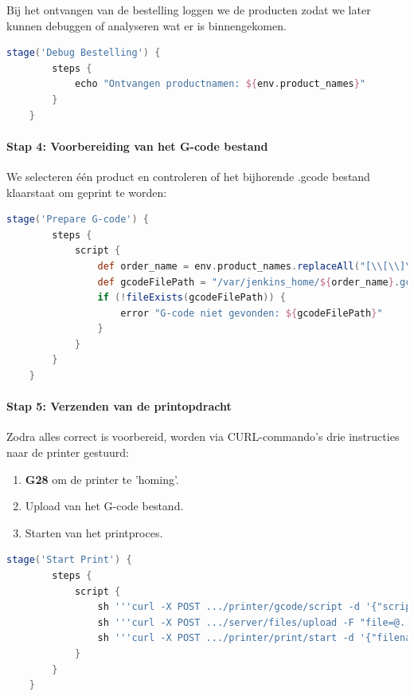 \begin{enumerate}
Bij het ontvangen van de bestelling loggen we de producten zodat we later kunnen debuggen of analyseren wat er is binnengekomen.

\begin{lstlisting}[language=groovy, caption=Debugging van de ontvangen productnamen]
    stage('Debug Bestelling') {
        steps {
            echo "Ontvangen productnamen: ${env.product_names}"
        }
    }
\end{lstlisting}

\paragraph*{Stap 4: Voorbereiding van het G-code bestand}

We selecteren één product en controleren of het bijhorende .gcode bestand klaarstaat om geprint te worden:

\begin{lstlisting}[language=groovy, caption=Controleren van G-code beschikbaarheid]
    stage('Prepare G-code') {
        steps {
            script {
                def order_name = env.product_names.replaceAll("[\\[\\]\" ]", "").split(",")[0]
                def gcodeFilePath = "/var/jenkins_home/${order_name}.gcode"
                if (!fileExists(gcodeFilePath)) {
                    error "G-code niet gevonden: ${gcodeFilePath}"
                }
            }
        }
    }
\end{lstlisting}

\paragraph*{Stap 5: Verzenden van de printopdracht}

Zodra alles correct is voorbereid, worden via CURL-commando’s drie instructies naar de printer gestuurd:

\begin{enumerate}
    \item \textbf{G28} om de printer te 'homing'.
    \item Upload van het G-code bestand.
    \item Starten van het printproces.
\end{enumerate}

\begin{lstlisting}[language=groovy, caption=Starten van het printproces via curl]
    stage('Start Print') {
        steps {
            script {
                sh '''curl -X POST .../printer/gcode/script -d '{"script": "G28"}' '''
                sh '''curl -X POST .../server/files/upload -F "file=@..." '''
                sh '''curl -X POST .../printer/print/start -d '{"filename": "..."}' '''
            }
        }
    }
\end{lstlisting}


\end{enumerate}
